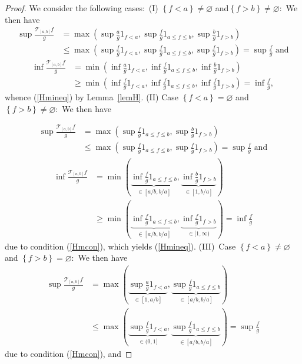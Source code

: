 \documentclass[10pt,a4paper]{amsart}
\begin{document}
\begin{proof}
We consider the following cases:\ (I) $\left\{  f<a\right\}  \neq\varnothing$
and$\left\{  f>b\right\}  \neq\varnothing:$ We then have%
\begin{align*}
\sup\frac{\mathcal{T}_{\left[  a,b\right]  }f}{g} &  =\max\left(  \sup\frac
{a}{g}1_{f<a},\sup\frac{f}{g}1_{a\leq f\leq b},\sup\frac{b}{g}1_{f>b}\right)
\\
&  \leq\max\left(  \sup\frac{f}{g}1_{f<a},\sup\frac{f}{g}1_{a\leq f\leq
b},\sup\frac{f}{g}1_{f>b}\right)  =\sup\frac{f}{g}\text{ \ \ and}%
\end{align*}%
\begin{align*}
\inf\frac{\mathcal{T}_{\left[  a,b\right]  }f}{g} &  =\min\left(  \inf\frac
{a}{g}1_{f<a},\inf\frac{f}{g}1_{a\leq f\leq b},\inf\frac{b}{g}1_{f>b}\right)
\\
&  \geq\min\left(  \inf\frac{f}{g}1_{f<a},\inf\frac{f}{g}1_{a\leq f\leq
b},\inf\frac{f}{g}1_{f>b}\right)  =\inf\frac{f}{g},
\end{align*}
whence (\ref{Hmineq}) by Lemma~\ref{lemH}. (II) Case $\left\{  f<a\right\}  =\varnothing$ and
$\left\{  f>b\right\}  \neq\varnothing:$ We then have%

\begin{align*}
\sup\frac{\mathcal{T}_{\left[  a,b\right]  }f}{g} &  =\max\left(  \sup\frac
{f}{g}1_{a\leq f\leq b},\sup\frac{b}{g}1_{f>b}\right)  \\
&  \leq\max\left(  \sup\frac{f}{g}1_{a\leq f\leq b},\sup\frac{f}{g}%
1_{f>b}\right)  =\sup\frac{f}{g}\text{ \ \ and}%
\end{align*}
\begin{align*}
\inf\frac{\mathcal{T}_{\left[  a,b\right]  }f}{g} &  =\min\left(
\underset{\in\left[  a/b,b/a\right]  }{\underbrace{\inf\frac{f}{g}1_{a\leq
f\leq b}}},\underset{\in\left[  1,b/a\right]  }{\underbrace{\inf\frac{b}%
{g}1_{f>b}}}\right)  \\
&  \geq\min\left(  \underset{\in\left[  a/b,b/a\right]  }{\underbrace{\inf
\frac{f}{g}1_{a\leq f\leq b}}},\underset{\in\lbrack1,\infty)}{\underbrace{\inf
\frac{f}{g}1_{f>b}}}\right)  =\inf\frac{f}{g}%
\end{align*}
due to condition (\ref{Hmcon}), which yields (\ref{Hmineq}). (III)\ Case
$\left\{  f<a\right\}  \neq\varnothing$ and $\left\{  f>b\right\}
=\varnothing:$ We then have%
\begin{align*}
\sup\frac{\mathcal{T}_{\left[  a,b\right]  }f}{g} &  =\max\left(
\underset{\in\left[  1,a/b\right]  }{\underbrace{\sup\frac{a}{g}1_{f<a}}%
},\underset{\in\left[  a/b,b/a\right]  }{\underbrace{\sup\frac{f}{g}1_{a\leq
f\leq b}}}\right)  \\
&  \leq\max\left(  \underset{\in(0,1]}{\underbrace{\sup\frac{f}{g}1_{f<a}}%
},\underset{\in\left[  a/b,b/a\right]  }{\underbrace{\sup\frac{f}{g}1_{a\leq
f\leq b}}}\right)  =\sup\frac{f}{g}%
\end{align*}
due to condition (\ref{Hmcon}), and%


\end{proof}
\end{document}
